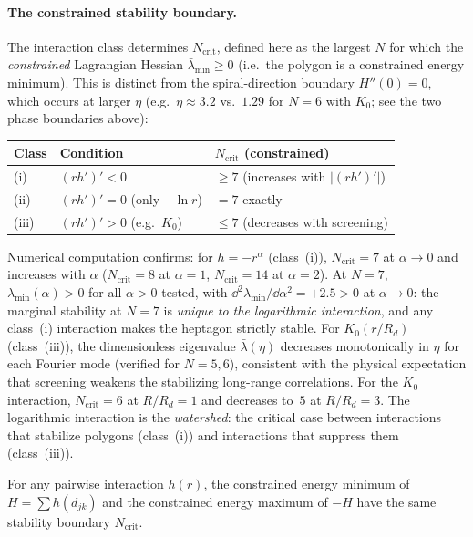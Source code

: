 \paragraph{The constrained stability boundary.}
The interaction class determines $N_{\mathrm{crit}}$, defined here as
the largest $N$ for which the \emph{constrained} Lagrangian Hessian
$\bar\lambda_{\min} \ge 0$ (i.e.\ the polygon is a constrained energy
minimum).  This is distinct from the spiral-direction boundary
$H''(0) = 0$, which occurs at larger $\eta$ (e.g.\ $\eta \approx 3.2$
vs.\ $1.29$ for $N = 6$ with $K_0$; see the two phase boundaries above):
\begin{center}
\begin{tabular}{lll}
\toprule
Class & Condition & $N_{\mathrm{crit}}$ (constrained) \\
\midrule
(i) & $(rh')' < 0$ & $\ge 7$ (increases with $|(rh')'|$) \\
(ii) & $(rh')' = 0$ (only $-\ln r$) & $= 7$ exactly \\
(iii) & $(rh')' > 0$ (e.g.\ $K_0$) & $\le 7$
  (decreases with screening) \\
\bottomrule
\end{tabular}
\end{center}
\noindent
Numerical computation confirms: for $h = -r^\alpha$ (class~(i)),
$N_{\mathrm{crit}} = 7$ at $\alpha \to 0$ and increases with $\alpha$
($N_{\mathrm{crit}} = 8$ at $\alpha = 1$, $N_{\mathrm{crit}} = 14$
at $\alpha = 2$).  At $N = 7$, $\lambda_{\min}(\alpha) > 0$ for all
$\alpha > 0$ tested, with
$\dd^2\lambda_{\min}/\dd\alpha^2 = +2.5 > 0$ at $\alpha \to 0$:
the marginal stability at $N = 7$ is \emph{unique to the logarithmic
interaction}, and any class~(i) interaction makes the heptagon strictly
stable.  For $K_0(r/R_d)$ (class~(iii)), the dimensionless eigenvalue
$\bar\lambda(\eta)$ decreases monotonically in $\eta$ for each Fourier
mode (verified for $N = 5, 6$), consistent with the physical expectation
that screening weakens the stabilizing long-range correlations.
For the $K_0$ interaction,
$N_{\mathrm{crit}} = 6$ at $R/R_d = 1$ and decreases to~$5$ at
$R/R_d = 3$.  The logarithmic interaction is the \emph{watershed}:
the critical case between interactions that stabilize polygons
(class~(i)) and interactions that suppress them (class~(iii)).

\begin{proposition}\label{prop:duality}
For any pairwise interaction $h(r)$, the constrained energy minimum
of $H = \sum h(d_{jk})$ and the constrained energy maximum of $-H$
have the same stability boundary $N_{\mathrm{crit}}$.
\end{proposition}

